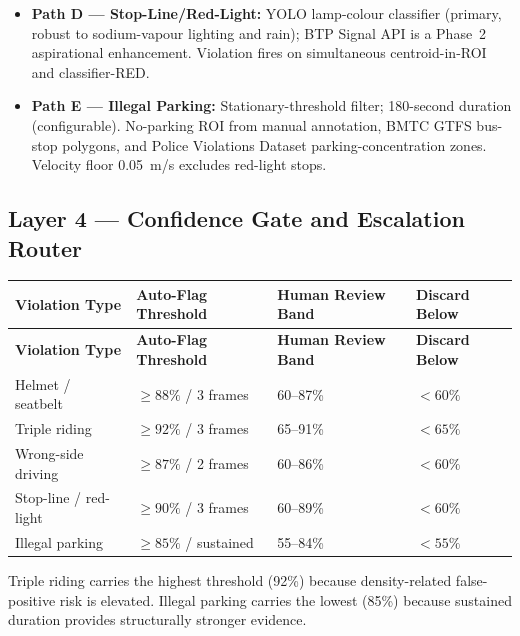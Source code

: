 \documentclass[11pt,a4paper]{article}
\begin{document}
\begin{itemize}[itemsep=0.3em]
    \item \textbf{Path D — Stop-Line/Red-Light:} YOLO lamp-colour classifier (primary, robust to sodium-vapour lighting and rain); BTP Signal API is a Phase~2 aspirational enhancement. Violation fires on simultaneous centroid-in-ROI and classifier-RED.

    \item \textbf{Path E — Illegal Parking:} Stationary-threshold filter; 180-second duration (configurable). No-parking ROI from manual annotation, BMTC GTFS bus-stop polygons, and Police Violations Dataset parking-concentration zones. Velocity floor 0.05~m/s excludes red-light stops.
\end{itemize}

\subsection*{Layer 4 — Confidence Gate and Escalation Router}

\begin{longtable}{L{4cm} C{3cm} C{3cm} C{2.5cm}}
    \toprule
    \color{white}\textbf{Violation Type} & \color{white}\textbf{Auto-Flag Threshold} & \color{white}\textbf{Human Review Band} & \color{white}\textbf{Discard Below} \\
    \midrule
    \endfirsthead
    \toprule
    \color{white}\textbf{Violation Type} & \color{white}\textbf{Auto-Flag Threshold} & \color{white}\textbf{Human Review Band} & \color{white}\textbf{Discard Below} \\
    \midrule
    \endhead
    \bottomrule
    \endfoot

    Helmet / seatbelt & $\geq 88\%$ / 3 frames & 60–87\% & $< 60\%$ \\
    Triple riding & $\geq 92\%$ / 3 frames & 65–91\% & $< 65\%$ \\
    Wrong-side driving & $\geq 87\%$ / 2 frames & 60–86\% & $< 60\%$ \\
    Stop-line / red-light & $\geq 90\%$ / 3 frames & 60–89\% & $< 60\%$ \\
    Illegal parking & $\geq 85\%$ / sustained & 55–84\% & $< 55\%$ \\
\end{longtable}

Triple riding carries the highest threshold (92\%) because density-related false-positive risk is elevated. Illegal parking carries the lowest (85\%) because sustained duration provides structurally stronger evidence.
\end{document}
